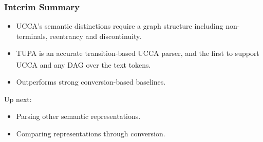 \documentclass[t,xcolor={svgnames,table}]{beamer}
\newcommand{\parser}[1]{TUPA\textsubscript{#1}}
\begin{document}
\begin{frame}
\begin{center}
{    }
\end{center}
\end{frame}

\begin{frame}
\frametitle{Interim Summary}
\begin{itemize}
 \item UCCA's semantic distinctions require a graph structure including {\color{blue}non-terminals}, {\color{orange}reentrancy} and {\color{red}discontinuity}.
 \item \parser{} is an accurate transition-based UCCA parser,
 	and the first to support UCCA and any DAG over the text tokens.
 \item Outperforms strong conversion-based baselines.
\end{itemize}

\pause
\vfill

Up next:

\begin{itemize}
 \item Parsing other semantic representations.
 \item Comparing representations through conversion.
\end{itemize}
\end{frame}
\end{document}
